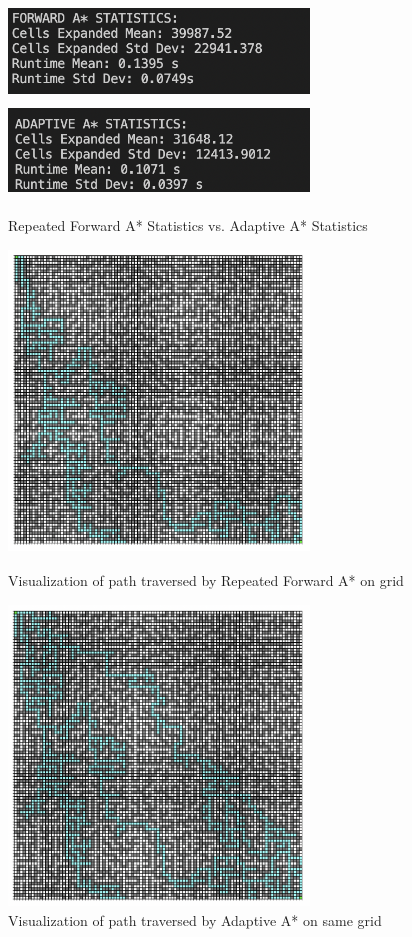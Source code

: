 \documentclass[12pt, letterpaper]{article}
\begin{document}
\begin{figure}[p]
\centering
\includegraphics[width=8cm, height=2.5cm]{forwardstat}
\includegraphics[width=8cm, height=2.5cm]{adaptivestat}
\caption[margin=0.1cm]{Repeated Forward A* Statistics vs. Adaptive A* Statistics}

\includegraphics[width=8cm, height=8cm]{forward_a1}
\caption[margin=0.1cm]{Visualization of path traversed by Repeated Forward A* on grid}
\includegraphics[width=8cm, height=8cm]{f_adaptive2}
\caption[margin=0.1cm]{Visualization of path traversed by Adaptive A* on same grid}

\end{figure}
\pagebreak
\end{document}
